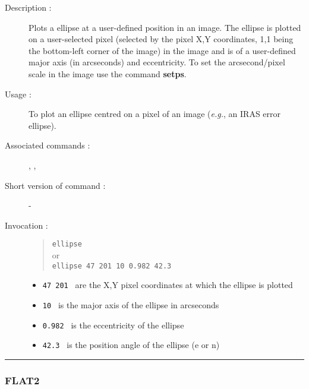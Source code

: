 \begin{description}

\item[Description :] Plots a ellipse at a user-defined position in an
image. The ellipse is plotted on a user-selected pixel (selected by the
pixel X,Y coordinates, 1,1 being the bottom-left corner of the image) in
the image and is of a user-defined major axis (in arcseconds) and
eccentricity. To set the arcsecond/pixel scale in the image use the
command {\bf setps}.

\item[Usage :] To plot an ellipse centred on a pixel of an image
(\emph{e.g.}, an IRAS error ellipse).
\item[Associated commands :] {\tt {}},
{\tt {}}, {\tt {}}
\item[Short version of command :] -
\item[Invocation :]

\begin{quote}{\tt  ellipse }\\
or \\
{\tt ellipse 47 201 10 0.982 42.3 }
\end{quote}

\begin{itemize}

\item {\tt 47 201 } are the X,Y pixel coordinates at which the ellipse
is plotted
\item {\tt 10 } is the major axis of the ellipse in arcseconds
\item {\tt 0.982 } is the eccentricity of the ellipse
\item {\tt 42.3 } is the position angle of the ellipse (e or n)
\end{itemize}

\end{description}

\hrule
\subsubsection*{\label{FLAT2}FLAT2}

